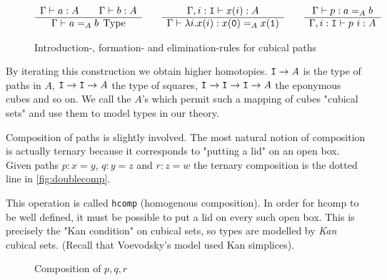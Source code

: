\begin{figure}[h]
\begin{equation*}
  \begin{array}[t]{c}
    \Gamma \vdash a : A \qquad \Gamma \vdash b : A\\
    \hline
    \Gamma \vdash a =_A b \; \operatorname{Type}\\
  \end{array}
  \qquad
  \begin{array}[t]{c}
    \Gamma, i : \texttt{I} \vdash x(i) : A\\
    \hline
    \Gamma \vdash \lambda i.x(i) : x(\texttt{0}) =_A x(\texttt{1})\\
  \end{array}
  \qquad
  \begin{array}[t]{c}
    \Gamma \vdash p : a =_A b\\
    \hline
    \Gamma, i : \texttt{I} \vdash p~i : A
  \end{array}
\end{equation*}
  \caption{Introduction-, formation- and elimination-rules for cubical paths}
  \label{eq:path-rules}
\end{figure}

By iterating this construction we obtain higher homotopies. $\texttt{I} \rightarrow A$
is the type of paths in $A$, $\texttt{I} \rightarrow \texttt{I} \rightarrow A$ the type of squares,
$\texttt{I} \rightarrow \texttt{I} \rightarrow \texttt{I} \rightarrow A$ the eponymous cubes and so on.
We call the $A$'s which permit such a mapping of cubes "cubical sets" and use
them to model types in our theory.

Composition of paths is slightly involved. The most natural notion of composition
is actually ternary because it corresponds to "putting a lid" on an open box. Given
paths $p : x = y$, $q : y = z$ and $r : z = w$ the ternary composition is the dotted line
in \autoref{fig:doublecomp}.

This operation is called \texttt{hcomp} (homogenous composition). In order for hcomp
to be well defined, it must be possible to put a lid on every such open box. This is precisely
the "Kan condition" on cubical sets, so types are modelled by \emph{Kan} cubical sets. (Recall
that Voevodsky's model used Kan simplices).

\begin{figure}[h]
\centering
{}
\caption{Composition of $p,q,r$}
\label{fig:doublecomp}
\end{figure}

